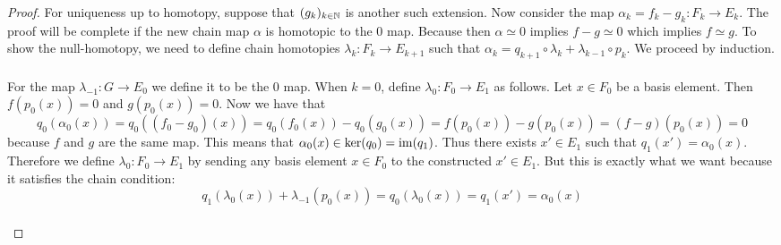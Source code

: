 \documentclass[a4paper]{article}
\begin{document}
\begin{prp}{}{}
\begin{proof}
For uniqueness up to homotopy, suppose that $(g_k)_{k\in\mathbb{N}}$ is another such extension. Now consider the map $\alpha_k=f_k-g_k:F_k\to E_k$. The proof will be complete if the new chain map $\alpha$ is homotopic to the $0$ map. Because then $\alpha\simeq 0$ implies $f-g\simeq 0$ which implies $f\simeq g$. To show the null-homotopy, we need to define chain homotopies $\lambda_k:F_k\to E_{k+1}$ such that $\alpha_k=q_{k+1}\circ\lambda_k+\lambda_{k-1}\circ p_k$. We proceed by induction. \\~\\

For the map $\lambda_{-1}:G\to E_0$ we define it to be the $0$ map. When $k=0$, define $\lambda_0:F_0\to E_1$ as follows. Let $x\in F_0$ be a basis element. Then $f(p_0(x))=0$ and $g(p_0(x))=0$. Now we have that $$q_0(\alpha_0(x))=q_0((f_0-g_0)(x))=q_0(f_0(x))-q_0(g_0(x))=f(p_0(x))-g(p_0(x))=(f-g)(p_0(x))=0$$ because $f$ and $g$ are the same map. This means that $\alpha_0(x)\in\ker(q_0)=\operatorname{im}(q_1)$. Thus there exists $x'\in E_1$ such that $q_1(x')=\alpha_0(x)$. Therefore we define $\lambda_0:F_0\to E_1$ by sending any basis element $x\in F_0$ to the constructed $x'\in E_1$. But this is exactly what we want because it satisfies the chain condition: $$q_1(\lambda_0(x))+\lambda_{-1}(p_0(x))=q_0(\lambda_0(x))=q_1(x')=\alpha_0(x)$$~\\


\end{proof}
\end{prp}
\end{document}
